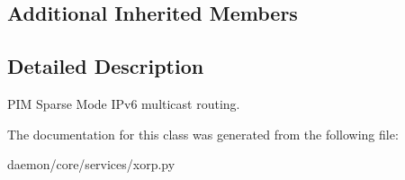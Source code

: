 \subsection*{Additional Inherited Members}


\subsection{Detailed Description}
\begin{DoxyVerb}PIM Sparse Mode IPv6 multicast routing.
\end{DoxyVerb}
 

The documentation for this class was generated from the following file\+:\begin{DoxyCompactItemize}
\item 
daemon/core/services/xorp.\+py\end{DoxyCompactItemize}
